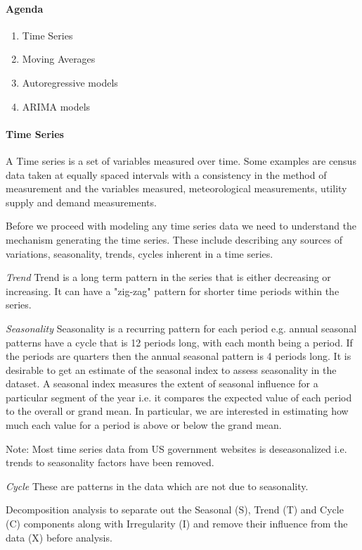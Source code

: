 \documentclass[10pt]{article}\usepackage[]{graphicx}\usepackage[]{color}
\begin{document}
\paragraph{Agenda}
\begin{enumerate}
  \itemsep0em
  \item Time Series 
  \item Moving Averages
  \item Autoregressive models
  \item ARIMA models
\end{enumerate}


\paragraph{Time Series}

A Time series is a set of variables measured over time. Some examples are census data taken at equally spaced intervals with a consistency in the method of measurement and the variables measured, meteorological measurements, utility supply and demand measurements.

Before we proceed with modeling any time series data we need to understand the mechanism generating the time series. These include describing any sources of variations, seasonality, trends, cycles inherent in a time series.

\emph{Trend} Trend is a long term pattern in the series that is either decreasing or increasing. It can have a "zig-zag" pattern for shorter time periods within the series.

\emph{Seasonality} Seasonality is a recurring pattern for each period e.g. annual seasonal patterns have a cycle that is 12 periods long, with each month being a period. If the periods are quarters then the annual seasonal pattern is 4 periods long. It is desirable to get an estimate of the seasonal index to assess seasonality in the dataset. A seasonal index measures the extent of seasonal influence for a particular segment of the year i.e. it compares the expected value of each period to the overall or grand mean. In particular, we are interested in estimating how much each value for a period is above or below the grand mean. 

Note: Most time series data from US government websites is deseasonalized i.e. trends to seasonality factors have been removed.

\emph{Cycle} These are patterns in the data which are not due to seasonality.

Decomposition analysis to separate out the Seasonal (S), Trend (T) and Cycle (C) components along with Irregularity (I) and remove their influence from the data (X) before analysis.
\end{document}
